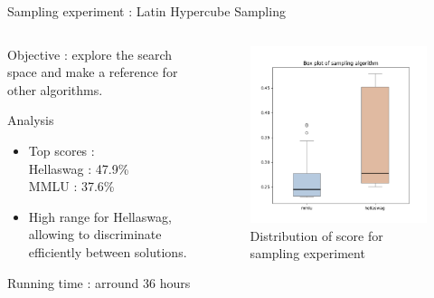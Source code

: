 \begin{frame}[allowframebreaks]{Sampling experiment : Latin Hypercube Sampling}
    
    \begin{columns}
        \begin{column}{0.45\textwidth}
        Objective : explore the search space and make a reference for other algorithms.
        \begin{block}{Analysis}
            \begin{itemize}
                \item Top scores : \\ \quad Hellaswag : 47.9\% \\ \quad MMLU : 37.6\%
                \item High range for Hellaswag, allowing to discriminate efficiently between solutions.
            \end{itemize}
            
        Running time : arround 36 hours
        
        \end{block}   
    \end{column}

    \begin{column}{0.45\textwidth}
        \begin{figure}
            \centering
            \includegraphics[width = \textwidth]{imgs/experiments/lhs_box_plot.png}     
            \caption{Distribution of score for sampling experiment}         
        \end{figure}
         

\end{column}
\end{columns}
\end{frame}
